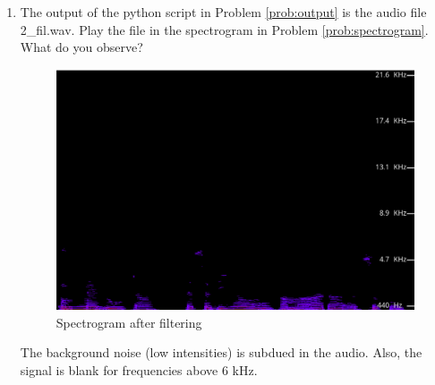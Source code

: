 \documentclass[journal,12pt,twocolumn]{IEEEtran}
\theoremstyle{remark}
\renewcommand\thesection{\arabic{section}}
\numberwithin{equation}{subsection}
\begin{document}
\begin{enumerate}[label=\thesection.\arabic*
,ref=\thesection.\theenumi]
\solution Noise in the audio is     filtered out using the following python code:
\begin{lstlisting}

import soundfile as sf
from scipy import signal

# Read .wav file
inpu_signal, fs = sf.read('2.wav')

# Order of the filter
order = 4

# Cutoff frequency 6kHz
cutoff_freq = 6000.0

# Digital frequency
Wn = 2 * cutoff_freq / fs

# b and a are numerator and denominator polynomials, respectively
b, a = signal.butter(order, Wn, 'low')

print(a)
print(b)

output_signal = signal.lfilter(b,a, input_signal)
# Write the output signal into a .wav file
sf.write('2_fil.wav', output_signal, fs)
\end{lstlisting} \label{py:filter}

\item
The output of the python script in Problem \ref{prob:output} is the audio file 2\_fil.wav. Play the file in the spectrogram in Problem \ref{prob:spectrogram}. What do you observe?
\\

\solution 
\begin{figure}[!h]
    \centering
    \includegraphics[width = \columnwidth]{figs/filtered.png}
    \caption{Spectrogram after filtering}
    \label{fig:2.3}
\end{figure}

The background noise (low intensities) is subdued in the audio.  Also,  the signal is blank for frequencies above 6 kHz.

\end{enumerate}
\end{document}
